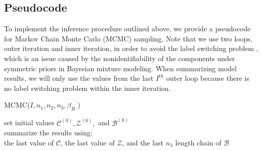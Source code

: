 \documentclass[a4paper]{article}
\begin{document}
 \subsection{Pseudocode}
 To implement the inference procedure outlined above, we provide a pseudocode for Markov Chain Monte Carlo (MCMC) sampling. Note that we use two loops, outer iteration and inner iteration, in order to avoid the label switching problem \citep{jasra2005markov}, which is an issue caused by the nonidentifiability of the components under symmetric priors in Bayesian mixture modeling. When summarizing model results, we will only use the values from the last $I^{th}$ outer loop because there is no label switching problem within the inner iteration.
 \begin{algorithm}[H]
 	\SetAlgoLined
 	\caption{MCMC($I, n_1, n_2, n_3, \beta_B$ )}
 	set initial values $\mathcal{C}^{(0)}, \mathcal{Z}^{(0)},$ and $\mathcal{B}^{(0)}$\\
 		summarize the results using:\\ the last value of $\mathcal{C}$, the last value of $\mathcal{Z}$, and the last $n_3$ length chain of $\mathcal{B}$
 \end{algorithm}
\end{document}
